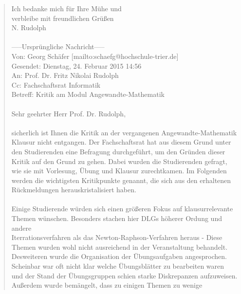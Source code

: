 \documentclass[a4paper, 11pt]{article} %
\begin{document}
\begin{quote}
Ich bedanke mich für Ihre Mühe und \\
verbleibe mit freundlichen Grüßen \\
N. Rudolph \\
\\
-----Ursprüngliche Nachricht----- \\
Von: Georg Schäfer [mailto:schaefg@hochschule-trier.de] \\
Gesendet: Dienstag, 24. Februar 2015 14:56 \\
An: Prof. Dr. Fritz Nikolai Rudolph \\
Cc: Fachschaftsrat Informatik \\
Betreff: Kritik am Modul Angewandte-Mathematik \\
\\
Sehr geehrter Herr Prof. Dr. Rudolph, \\
\\
sicherlich ist Ihnen die Kritik an der vergangenen Angewandte-Mathematik  \\
Klausur nicht entgangen. Der Fachschaftsrat hat aus diesem Grund unter \\
den Studierenden eine Befragung durchgeführt, um den Gründen dieser \\
Kritik auf den Grund zu gehen. Dabei wurden die Studierenden gefragt, \\
wie sie mit Vorlesung, Übung und Klausur zurechtkamen. Im Folgenden \\
werden die wichtigsten Kritikpunkte genannt, die sich aus den erhaltenen \\
Rückmeldungen herauskristalisiert haben. \\
\\
Einige Studierende würden sich einen größeren Fokus auf klausurrelevante \\
Themen wünschen. Besonders stachen hier DLGs höherer Ordung und andere \\
Iterrationsverfahren als das Newton-Raphson-Verfahren heraus - Diese \\
Themen wurden wohl nicht ausreichend in der Veranstaltung behandelt. \\
Desweiteren wurde die Organisation der Übungsaufgaben angesprochen. \\
Scheinbar war oft nicht klar welche Übungsblätter zu bearbeiten waren \\
und der Stand der Übungsgruppen schien starke Diskrepanzen aufzuweisen. \\
Außerdem wurde bemängelt, dass zu einigen Themen zu wenige \\

\end{quote}
\end{document}
